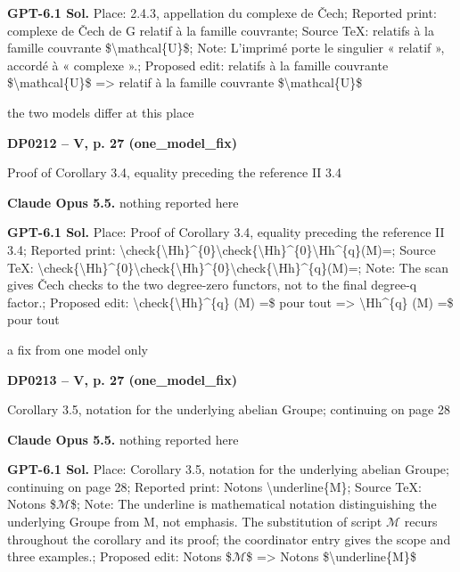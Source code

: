 \textbf{GPT-6.1 Sol.} Place: 2.4.3, appellation du complexe de Čech; Reported print: complexe de Čech de G relatif à la famille couvrante; Source TeX: relatifs à la famille couvrante \$\textbackslash{}mathcal\{U\}\$; Note: L'imprimé porte le singulier « relatif », accordé à « complexe ».; Proposed edit: relatifs à la famille couvrante \$\textbackslash{}mathcal\{U\}\$ =\allowbreak > relatif à la famille couvrante \$\textbackslash{}mathcal\{U\}\$\par
the two models differ at this place\par
\par\noindent\hypertarget{DP0212}{}\textbf{DP0212 -- V, p. 27 (one\_model\_fix)}\par
Proof of Corollary 3.4, equality preceding the reference II 3.4\par
\textbf{Claude Opus 5.5.} nothing reported here\par
\textbf{GPT-6.1 Sol.} Place: Proof of Corollary 3.4, equality preceding the reference II 3.4; Reported print: \textbackslash{}check\{\textbackslash{}Hh\}\textasciicircum{}\{0\}\textbackslash{}check\{\textbackslash{}Hh\}\textasciicircum{}\{0\}\textbackslash{}Hh\textasciicircum{}\{q\}(M)=; Source TeX: \textbackslash{}check\{\textbackslash{}Hh\}\textasciicircum{}\{0\}\textbackslash{}check\{\textbackslash{}Hh\}\textasciicircum{}\{0\}\textbackslash{}check\{\textbackslash{}Hh\}\textasciicircum{}\{q\}(M)=; Note: The scan gives Čech checks to the two degree-zero functors, not to the final degree-q factor.; Proposed edit: \textbackslash{}check\{\textbackslash{}Hh\}\textasciicircum{}\{q\} (M) =\$ pour tout =\allowbreak > \textbackslash{}Hh\textasciicircum{}\{q\} (M) =\$ pour tout\par
a fix from one model only\par
\par\noindent\hypertarget{DP0213}{}\textbf{DP0213 -- V, p. 27 (one\_model\_fix)}\par
Corollary 3.5, notation for the underlying abelian Groupe; continuing on page 28\par
\textbf{Claude Opus 5.5.} nothing reported here\par
\textbf{GPT-6.1 Sol.} Place: Corollary 3.5, notation for the underlying abelian Groupe; continuing on page 28; Reported print: Notons \textbackslash{}underline\{M\}; Source TeX: Notons \$\ensuremath{\mathcal{M}}\$; Note: The underline is mathematical notation distinguishing the underlying Groupe from M, not emphasis. The substitution of script \ensuremath{\mathcal{M}} recurs throughout the corollary and its proof; the coordinator entry gives the scope and three examples.; Proposed edit: Notons \$\ensuremath{\mathcal{M}}\$ =\allowbreak > Notons \$\textbackslash{}underline\{M\}\$\par
